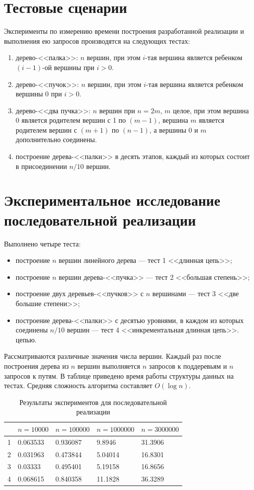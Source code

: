 \documentclass[specification,annotation]{itmo-student-thesis}
\begin{document}
\section{Тестовые сценарии}

Эксперименты по измерению времени построения разработанной реализации и выполнения ею запросов производятся на следующих тестах:
\begin{enumerate}
    \item дерево-<<палка>>: $n$ вершин, при этом $i$-тая вершина является ребенком $(i-1)$-ой вершины при $i > 0$.
    \item дерево-<<пучок>>: $n$ вершин, при этом $i$-тая вершина является ребенком вершины 0 при $i > 0$.
    \item дерево-<<два пучка>>: $n$ вершин при $n = 2m$, $m$ целое, при этом вершина 0 является родителем вершин с 1 по $(m-1)$,
          вершина $m$ является родителем вершин с $(m+1)$ по $(n-1)$, а вершины 0 и $m$ дополнительно соединены.
    \item построение дерева-<<палки>> в десять этапов, каждый из которых состоит в присоединении $n / 10$ вершин.
\end{enumerate}

\section{Экспериментальное исследование последовательной реализации}

Выполнено четыре теста: 
\begin{itemize}
\item построение $n$ вершин линейного дерева --- тест 1 <<длинная цепь>>; 
\item построение $n$ вершин дерева-<<пучка>> --- тест 2 <<большая степень>>; 
\item построение двух деревьев-<<пучков>> с $n$ вершинами --- тест 3  <<две большие степени>>; 
\item построение дерева-<<палки>> с десятью уровнями, в каждом из которых соединены $n/10$ вершин --- тест 4 <<инкрементальная длинная цепь>>.
цепью. 
\end{itemize}
Рассматриваются различные значения числа вершин. Каждый раз после построения дерева из $n$ вершин выполняется $n$ запросов к поддеревьям и $n$ запросов к путям. 
В таблице приведено время работы структуры данных на тестах. Средняя сложность алгоритма составляет $O (\log n)$.

\begin{table}[!ht]
\centering
\begin{tabular}{|l|l|l|l|l|}\hline
 & $n=10000$ & $n=100000$ & $n=1000000$ & $n=3000000$ \\\hline
1 & 0.063533 & 0.936087 & 9.8946 & 31.3906 \\\hline
2 & 0.031963 & 0.473844 & 5.04014 & 16.8301 \\\hline
3 & 0.03333 & 0.495401 & 5.19158 & 16.8656 \\\hline
4 & 0.068615 & 0.840358 & 11.1828 & 36.3289 \\\hline
\end{tabular}
\caption{Результаты экспериментов для последовательной реализации}\label{tbl:results-seq}
\end{table}
\end{document}
